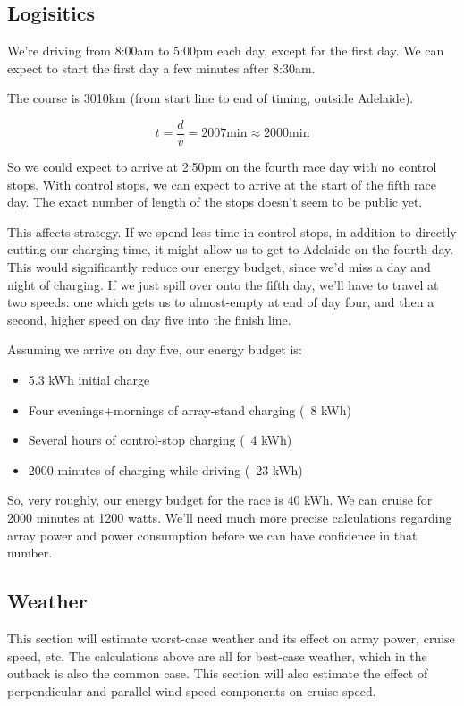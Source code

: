 \documentclass[letterpaper,12pt]{article}
\begin{document}
\subsection{Logisitics}

We're driving from 8:00am to 5:00pm each day, except for the first day. We can expect to start the first day a few minutes after 8:30am. 

The course is 3010km (from start line to end of timing, outside Adelaide).

$$t = \frac d v = 2007 \mbox{min} \approx 2000 \mbox{min}$$

So we could expect to arrive at 2:50pm on the fourth race day with no control stops. With control stops, we can expect to arrive at the start of the fifth race day. The exact number of length of the stops doesn't seem to be public yet.

This affects strategy. If we spend less time in control stops, in addition to directly cutting our charging time, it might allow us to get to Adelaide on the fourth day. This would significantly reduce our energy budget, since we'd miss a day and night of charging. If we just spill over onto the fifth day, we'll have to travel at two speeds: one which gets us to almost-empty at end of day four, and then a second, higher speed on day five into the finish line.


Assuming we arrive on day five, our energy budget is:
\begin{itemize}
\item 5.3 kWh initial charge
\item Four evenings+mornings of array-stand charging (~8 kWh)
\item Several hours of control-stop charging (~4 kWh)
\item 2000 minutes of charging while driving (~23 kWh)
\end{itemize}

So, very roughly, our energy budget for the race is 40 kWh. We can cruise for 2000 minutes at 1200 watts. We'll need much more precise calculations regarding array power and power consumption before we can have confidence in that number.

\subsection{Weather}
This section will estimate worst-case weather and its effect on array power, cruise speed, etc. The calculations above are all for best-case weather, which in the outback is also the common case. This section will also estimate the effect of perpendicular and parallel wind speed components on cruise speed.
\end{document}
